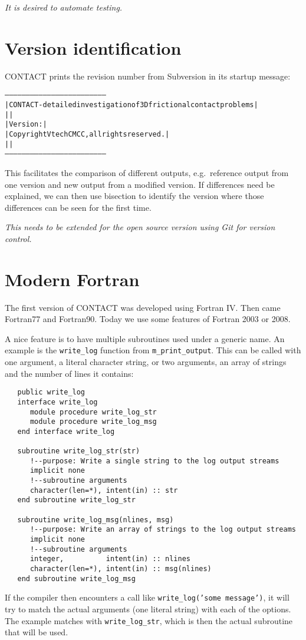 \documentclass[12pt]{report}
\begin{document}
{\em It is desired to automate testing.}

\section{Version identification}

CONTACT prints the revision number from Subversion in its startup message:
\begin{alltt}
   ------------------------------------------------------------------------
   |  CONTACT - detailed investigation of 3D frictional contact problems  |
   |                                                                      |
   |  Version:           |
   |  Copyright Vtech CMCC, all rights reserved.                          |
   |                        |
   ------------------------------------------------------------------------
\end{alltt}
This facilitates the comparison of different outputs, e.g.\ reference
output from one version and new output from a modified version. If
differences need be explained, we can then use bisection to identify the
version where those differences can be seen for the first time.

{\em This needs to be extended for the open source version using Git for 
version control.}

\section{Modern Fortran}

The first version of CONTACT was developed using Fortran IV. Then came
Fortran77 and Fortran90. Today we use some features of Fortran 2003 or
2008. 

A nice feature is to have multiple subroutines used under a generic name.
An example is the {\tt write\_log} function from {\tt m\_print\_output}.
This can be called with one argument, a literal character string, or two
arguments, an array of strings and the number of lines it contains:
{\small\begin{verbatim}
   public write_log
   interface write_log
      module procedure write_log_str
      module procedure write_log_msg
   end interface write_log

   subroutine write_log_str(str)
      !--purpose: Write a single string to the log output streams
      implicit none
      !--subroutine arguments
      character(len=*), intent(in) :: str
   end subroutine write_log_str

   subroutine write_log_msg(nlines, msg)
      !--purpose: Write an array of strings to the log output streams
      implicit none
      !--subroutine arguments
      integer,          intent(in) :: nlines
      character(len=*), intent(in) :: msg(nlines)
   end subroutine write_log_msg
\end{verbatim}}
If the compiler then encounters a call like {\tt write\_log('some
message')}, it will try to match the actual arguments (one literal string)
with each of the options. The example matches with {\tt write\_\-log\_\-str},
which is then the actual subroutine that will be used.
\end{document}

